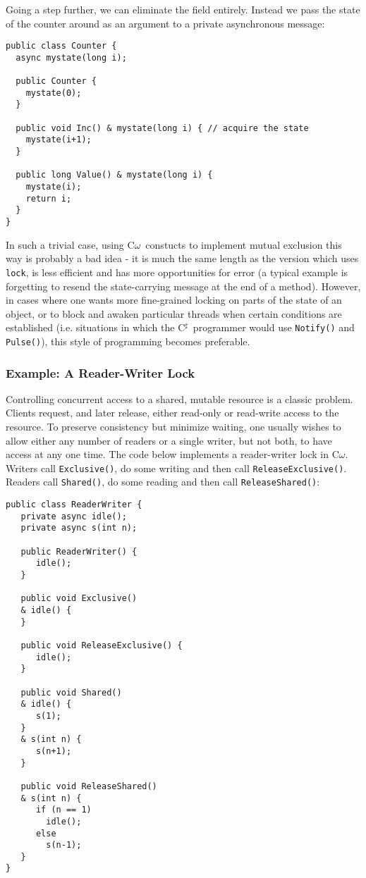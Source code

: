 \documentclass{article}
\newcommand{\comega}{\mbox{C$\omega$}}
\newcommand{\csharp}{\mbox{C$^\sharp$}}
\begin{document}
Going a step further, we can eliminate the field entirely. Instead we
pass the state of the counter around as an argument to a private
asynchronous message:
\begin{verbatim}
public class Counter {
  async mystate(long i);

  public Counter {
    mystate(0);
  }

  public void Inc() & mystate(long i) { // acquire the state
    mystate(i+1);
  }

  public long Value() & mystate(long i) {
    mystate(i);
    return i;
  }
}
\end{verbatim}
In such a trivial case, using \comega\ constucts to implement mutual
exclusion this way is probably a bad idea - it is much the same length
as the version which uses \verb|lock|, is less efficient and has more
opportunities for error (a typical example is forgetting to resend the
state-carrying message at the end of a method). However, in cases
where one wants more fine-grained locking on parts of the state of an
object, or to block and awaken particular threads when certain
conditions are established (i.e. situations in which the \csharp\
programmer would use \verb|Notify()| and \verb|Pulse()|), this style
of programming becomes preferable.

\subsubsection{Example: A Reader-Writer Lock}

Controlling concurrent access to a shared, mutable resource is a
classic problem. Clients request, and later release, either read-only
or read-write access to the resource. To preserve consistency but
minimize waiting, one usually wishes to allow either any number of
readers or a single writer, but not both, to have access at any one
time. The code below implements a reader-writer lock in
\comega. Writers call \verb|Exclusive()|, do some writing and then
call \verb|ReleaseExclusive()|. Readers call \verb|Shared()|, do some
reading and then call \verb|ReleaseShared()|:
\begin{verbatim}
public class ReaderWriter {
   private async idle();
   private async s(int n);

   public ReaderWriter() {
      idle();
   }

   public void Exclusive() 
   & idle() {
   }

   public void ReleaseExclusive() {
      idle(); 
   } 

   public void Shared() 
   & idle() {
      s(1);
   }
   & s(int n) {
      s(n+1);
   }

   public void ReleaseShared() 
   & s(int n) { 
      if (n == 1) 
        idle(); 
      else 
        s(n-1); 
   }
}
\end{verbatim}
\end{document}

